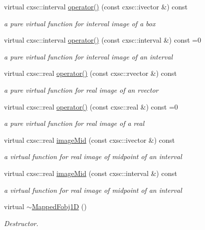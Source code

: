 \begin{DoxyCompactItemize}
\item 
virtual cxsc\-::interval \hyperlink{classsubpavings_1_1MappedFobj1D_a94837769e41eecd643c66958a47ea7c0}{operator()} (const cxsc\-::ivector \&) const 
\begin{DoxyCompactList}\small\item\em a pure virtual function for interval image of a box \end{DoxyCompactList}\item 
virtual cxsc\-::interval \hyperlink{classsubpavings_1_1MappedFobj1D_aa4a1f2507460641702a6a7cf07e41657}{operator()} (const cxsc\-::interval \&) const =0
\begin{DoxyCompactList}\small\item\em a pure virtual function for interval image of an interval \end{DoxyCompactList}\item 
virtual cxsc\-::real \hyperlink{classsubpavings_1_1MappedFobj1D_a9930e60eab4e038d6fd7e43101112c65}{operator()} (const cxsc\-::rvector \&) const 
\begin{DoxyCompactList}\small\item\em a pure virtual function for real image of an rvector \end{DoxyCompactList}\item 
virtual cxsc\-::real \hyperlink{classsubpavings_1_1MappedFobj1D_abee3fbd4c06d7d2f6e276f31d485eb7c}{operator()} (const cxsc\-::real \&) const =0
\begin{DoxyCompactList}\small\item\em a pure virtual function for real image of a real \end{DoxyCompactList}\item 
virtual cxsc\-::real \hyperlink{classsubpavings_1_1MappedFobj1D_a96eec102cb2489630456ef0f2afca86d}{image\-Mid} (const cxsc\-::ivector \&) const 
\begin{DoxyCompactList}\small\item\em a virtual function for real image of midpoint of an interval \end{DoxyCompactList}\item 
virtual cxsc\-::real \hyperlink{classsubpavings_1_1MappedFobj1D_ab1ba2e518c0447cfb4c09ca3fa99f493}{image\-Mid} (const cxsc\-::interval \&) const 
\begin{DoxyCompactList}\small\item\em a virtual function for real image of midpoint of an interval \end{DoxyCompactList}\item 
virtual \hyperlink{classsubpavings_1_1MappedFobj1D_ac10df1857234acc980780fcc417589a0}{$\sim$\-Mapped\-Fobj1\-D} ()
\begin{DoxyCompactList}\small\item\em \-Destructor. \end{DoxyCompactList}\end{DoxyCompactItemize}


